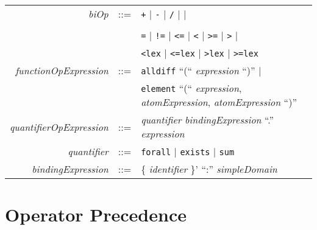 \documentclass{article}
\begin{document}
\begin{tabular}{rcl}
\textit{biOp} & ::= & {\tt +} $\mid$ {\tt -}  $\mid$ {\tt /}  $\mid$ {\tt *}  $\mid$  \verb1^1  $\mid$ \\
              &     &  \verb1\/1  $\mid$ \verb1/\1  $\mid$ {\tt =>}  $\mid$ {\tt <=>}  $\mid$ \\
              &     & {\tt =}  $\mid$ {\tt !=}  $\mid$ {\tt <=}  $\mid$ {\tt <}  $\mid$ {\tt >=}  $\mid$ {\tt >} $\mid$ \\
              &     & {\tt <lex} $\mid$ {\tt <=lex} $\mid$ {\tt >lex} $\mid$ {\tt >=lex} \\
\textit{functionOpExpression} & ::= & \texttt{alldiff} ``(`` \textit{expression} ``)'' $\mid$ \\
                              &     & \texttt{element} ``(``
                              \textit{expression},
                               \textit{atomExpression},
                              \textit{atomExpression} ``)''\\ %

 \textit{quantifierOpExpression} & ::= & \textit{quantifier} \textit{bindingExpression} ``.'' \textit{expression} \\
\textit{quantifier} & ::= & \texttt{forall} $\mid$ \texttt{exists} $\mid$ \texttt{sum} \\ 
\textit{bindingExpression} & ::= & \{ \textit{identifier} \}' ``:'' \textit{simpleDomain} \\




\end{tabular}

\section{Operator Precedence}
\end{document}
